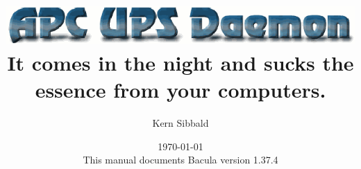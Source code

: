 \documentclass[11pt,a4paper]{report}
\begin{document}
\sloppy

\parskip 10pt
\parindent 0pt

\title{\includegraphics{./apcupsd.eps} \\ \bigskip
   \Large{It comes in the night and sucks the essence
        from your computers.} }
\author{Kern Sibbald}
\date{\vspace{2.0in}\today \\
      This manual documents Bacula version 1.37.4}

\maketitle

\clearpage
\tableofcontents
\clearpage
\listoffigures
\clearpage
\listoftables
\clearpage


%


\end{document}
